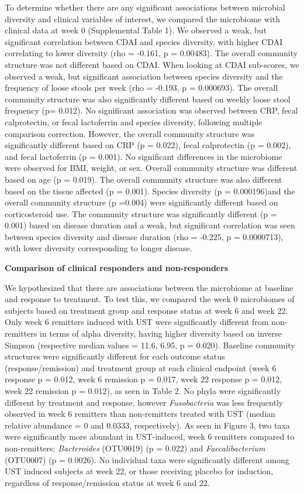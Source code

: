 \documentclass[11pt,]{article}
\begin{document}
To determine whether there are any significant associations between
microbial diversity and clinical variables of interest, we compared the
microbiome with clinical data at week 0 (Supplemental Table 1). We
observed a weak, but significant correlation between CDAI and species
diversity, with higher CDAI correlating to lower diversity (rho =
-0.161, p = 0.00483). The overall community structure was not different
based on CDAI. When looking at CDAI sub-scores, we observed a weak, but
significant association between species diversity and the frequency of
loose stools per week (rho = -0.193, p = 0.000693). The overall
community structure was also significantly different based on weekly
loose stool frequency (p= 0.012). No significant association was
observed between CRP, fecal calprotectin, or fecal lactoferrin and
species diversity, following multiple comparison correction. However,
the overall community structure was significantly different based on CRP
(p = 0.022), fecal calprotectin (p = 0.002), and fecal lactoferrin (p =
0.001). No significant differences in the microbiome were observed for
BMI, weight, or sex. Overall community structure was different based on
age (p = 0.019). The overall community structure was also different
based on the tissue affected (p = 0.001). Species diversity (p =
0.000196)and the overall community structure (p =0.004) were
significantly different based on corticosteroid use. The community
structure was significantly different (p = 0.001) based on disease
duration and a weak, but significant correlation was seen between
species diversity and disease duration (rho = -0.225, p = 0.0000713),
with lower diversity corresponding to longer disease.

\textbf{Comparison of clinical responders and non-responders}

We hypothesized that there are associations between the microbiome at
baseline and response to treatment. To test this, we compared the week 0
microbiomes of subjects based on treatment group and response status at
week 6 and week 22. Only week 6 remitters induced with UST were
significantly different from non-remitters in terms of alpha diversity,
having higher diversity based on inverse Simpson (respective median
values = 11.6, 6.95, p = 0.020). Baseline community structures were
significantly different for each outcome status (response/remission) and
treatment group at each clinical endpoint (week 6 response p = 0.012,
week 6 remission p = 0.017, week 22 response p = 0.012, week 22
remission p = 0.012), as seen in Table 2. No phyla were significantly
different by treatment and response, however \emph{Fusobacteria} was
less frequently observed in week 6 remitters than non-remitters treated
with UST (median relative abundance = 0 and 0.0333, respectively). As
seen in Figure 3, two taxa were significantly more abundant in
UST-induced, week 6 remitters compared to non-remitters;
\emph{Bacteroides} (OTU0019) (p = 0.022) and \emph{Faecalibacterium}
(OTU0007) (p = 0.0026). No individual taxa were significantly different
among UST induced subjects at week 22, or those receiving placebo for
induction, regardless of response/remission status at week 6 and 22.
\end{document}
